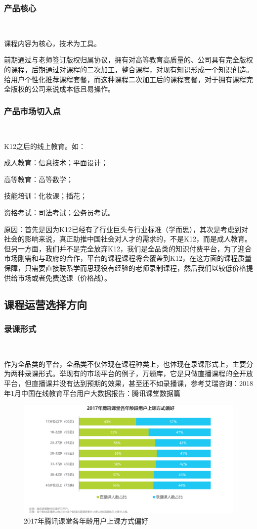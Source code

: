 \subsubsection{产品核心}\

课程内容为核心，技术为工具。

前期通过与老师签订版权归属协议，拥有对高等教育高质量的、公司具有完全版权的课程，后期通过对课程的二次加工，整合课程，对现有知识形成一个知识创造。给用户个性化推荐课程套餐，而这种课程二次加工后的课程套餐，对于拥有课程完全版权的公司来说成本低且易操作。

\subsubsection{产品市场切入点}\

K12之后的线上教育。如：

成人教育：信息技术；平面设计；

高等教育：高等数学；

技能培训：化妆课；插花；

资格考试：司法考试；公务员考试。

原因：首先是因为K12已经有了行业巨头与行业标准（学而思），其次是考虑到对社会的影响来说，真正助推中国社会对人才的需求的，不是K12，而是成人教育。但另一方面，我们并不是完全放弃K12，我们是全品类的知识付费平台，为了迎合市场刚需和与政府的合作，平台的课程课程将会覆盖到K12，在这方面的课程质量保障，只需要直接联系学而思现役有经验的老师录制课程，然后我们以较低价格提供给市场或者免费送课（价格战）。

\subsection{课程运营选择方向}
\subsubsection{录课形式}\

作为全品类的平台，全品类不仅体现在课程种类上，也体现在录课形式上，主要分为两种录课形式。举现有的市场平台的例子，万题库，它是只做直播课程的全开放平台，但直播课并没有达到预期的效果，甚至还不如录播课，参考艾瑞咨询：2018年1月中国在线教育平台用户大数据报告：腾讯课堂数据篇

\begin{figure}[H]
	\centering
	\includegraphics[width=0.9\columnwidth]{figures/tecent_couse.png}
	\caption{2017年腾讯课堂各年龄用户上课方式偏好}
	\label{fg:tecent_couse}
\end{figure}

